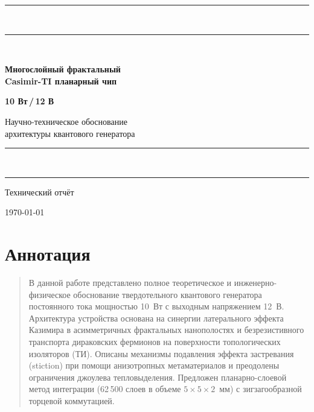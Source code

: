 \documentclass[11pt,a4paper]{article}
\begin{document}
\begin{titlepage}
  \centering
  \vspace*{1.6cm}

  {\color{accent}\rule{\linewidth}{1.2pt}}\\[0.55em]
  {\color{accent}\rule{\linewidth}{0.4pt}}\\[2.4em]

  {\LARGE\bfseries Многослойный фрактальный\\[0.35em]
   Casimir-TI планарный чип\par}

  \vspace{1.3em}
  {\Huge\bfseries\color{accent} 10 Вт\,/\,12 В\par}

  \vspace{2em}
  {\Large Научно-техническое обоснование\\[0.3em]
   архитектуры квантового генератора\par}

  \vspace{2.4em}
  {\color{accent}\rule{\linewidth}{0.4pt}}\\[0.55em]
  {\color{accent}\rule{\linewidth}{1.2pt}}

  \vfill
  {\large Технический отчёт\par}
  \vspace{0.45em}
  {\large \today\par}
  \vspace*{1.4cm}
\end{titlepage}

\section*{Аннотация}
\begin{quote}
В данной работе представлено полное теоретическое и инженерно-физическое
обоснование твердотельного квантового генератора постоянного тока мощностью
10~Вт с выходным напряжением 12~В. Архитектура устройства основана на синергии
латерального эффекта Казимира в асимметричных фрактальных нанополостях и
безрезистивного транспорта дираковских фермионов на поверхности топологических
изоляторов (ТИ). Описаны механизмы подавления эффекта застревания (stiction)
при помощи анизотропных метаматериалов и преодолены ограничения джоулева
тепловыделения. Предложен планарно-слоевой метод интеграции
(62\,500 слоев в объеме $5\times5\times2$~мм) с зигзагообразной торцевой
коммутацией.
\end{quote}
\end{document}
